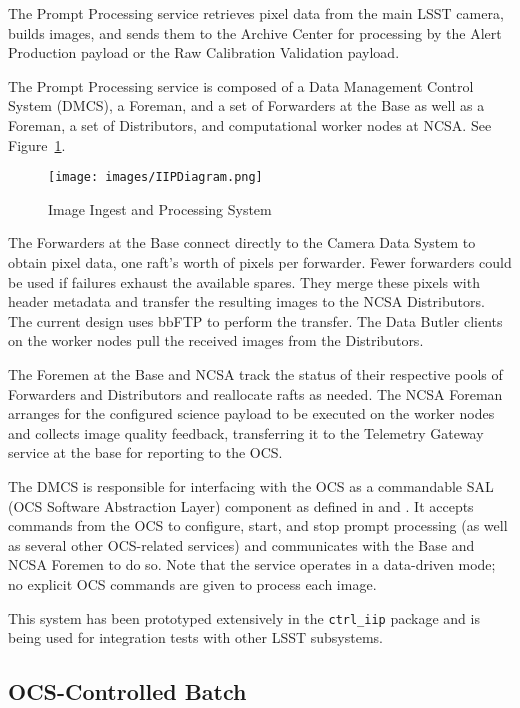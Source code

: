 \documentclass[DM,toc]{lsstdoc}
\begin{document}
The Prompt Processing service retrieves pixel data from the main LSST camera,
builds images, and sends them to the Archive Center for processing by the Alert Production payload or the Raw Calibration Validation payload.

The Prompt Processing service is composed of a Data Management Control System
(DMCS), a Foreman, and a set of Forwarders at the Base as well as a Foreman, a
set of Distributors, and computational worker nodes at NCSA.  See Figure~\ref{fig:iipsystem}.

\begin{figure}
\centering
\texttt{[image: images/IIPDiagram.png]}
\caption{Image Ingest and Processing System}
\label{fig:iipsystem}
\end{figure}

The Forwarders at the Base connect directly to the Camera Data System to obtain
pixel data, one raft's worth of pixels per forwarder.  Fewer forwarders could
be used if failures exhaust the available spares.  They merge these pixels with
header metadata and transfer the resulting images to the NCSA Distributors.
The current design uses bbFTP to perform the transfer.  The Data Butler clients
on the worker nodes pull the received images from the Distributors.

The Foremen at the Base and NCSA track the status of their respective pools of
Forwarders and Distributors and reallocate rafts as needed.
The NCSA Foreman arranges for
the configured science payload to be executed on the worker nodes and collects
image quality feedback, transferring it to the Telemetry Gateway service at the
base for reporting to the OCS.

The DMCS is responsible for interfacing with the OCS as a commandable SAL
(OCS Software Abstraction Layer)
component as defined in  and .  It accepts
commands from the OCS to configure, start, and stop prompt processing (as well
as several other OCS-related services) and communicates with the Base and NCSA
Foremen to do so.  Note that the service operates in a data-driven mode; no
explicit OCS commands are given to process each image.

This system has been prototyped extensively in the \texttt{ctrl\_iip} package
and is being used for integration tests with other LSST subsystems.

\subsection{OCS-Controlled Batch}\label{ocs-controlled-batch}
\end{document}
